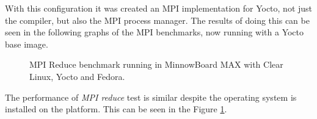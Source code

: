 With this configuration it was created an MPI implementation for Yocto, 
not just the compiler, but also the MPI process manager. The results of
doing this can be seen in the following graphs of the MPI benchmarks, now
running with a Yocto base image.

\begin{figure}[H]
\begin{center}
\end{center}
\caption{MPI Reduce benchmark running in MinnowBoard MAX with Clear Linux, Yocto
and Fedora.}
\label{mpi_reduce_yocto}
\end{figure}

The performance of \textit{MPI reduce} test is similar despite the operating
system is installed on the platform. This can be seen in the Figure
\ref{mpi_reduce_yocto}.

